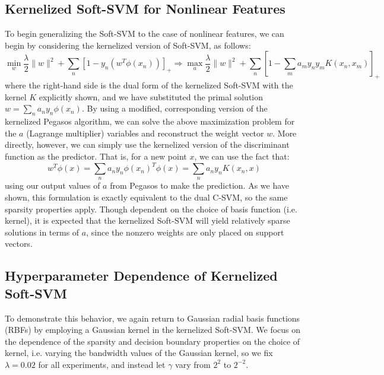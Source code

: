 \documentclass[10pt,psamsfonts]{amsart}
\theoremstyle{definition}
\theoremstyle{remark}
\numberwithin{equation}{section}
\begin{document}
\subsection{Kernelized Soft-SVM for Nonlinear Features} To begin generalizing the Soft-SVM to the case of nonlinear features, we can begin by considering the kernelized version of Soft-SVM, as follows:
$$\min_w \frac{\lambda}{2} \|w\|^2 +  \sum_n [1-y_n(w^T\phi(x_n))]_+ \Rightarrow \max_a \frac{\lambda}{2}\|w\|^2 + \sum_n \left[ 1- \sum_m a_m y_ny_m K(x_n,x_m) \right]_+$$
where the right-hand side is the dual form of the kernelized Soft-SVM with the kernel $K$ explicitly shown, and we have substituted the primal solution $w = \sum_n a_n y_n \phi(x_n)$. By using a modified, corresponding version of the kernelized Pegasos algorithm, we can solve the above maximization problem for the $a$ (Lagrange multiplier) variables and reconstruct the weight vector $w$. More directly, however, we can simply use the kernelized version of the discriminant function as the predictor. That is, for a new point $x$, we can use the fact that:
$$w^T\phi(x) = \sum_n a_n y_n \phi(x_n)^T\phi(x) = \sum_n a_n y_n K(x_n,x)$$
using our output values of $a$ from Pegasos to make the prediction. As we have shown, this formulation is exactly equivalent to the dual C-SVM, so the same sparsity properties apply. Though dependent on the choice of basis function (i.e. kernel), it is expected that the kernelized Soft-SVM will yield relatively sparse solutions in terms of $a$, since the nonzero weights are only placed on support vectors.

\subsection{Hyperparameter Dependence of Kernelized Soft-SVM} To demonstrate this behavior, we again return to Gaussian radial basis functions (RBFs) by employing a Gaussian kernel in the kernelized Soft-SVM. We focus on the dependence of the sparsity and decision boundary properties on the choice of kernel, i.e. varying the bandwidth values of the Gaussian kernel, so we fix $\lambda = 0.02$ for all experiments, and instead let $\gamma$ vary from $2^2$ to $2^{-2}$.
\end{document}
